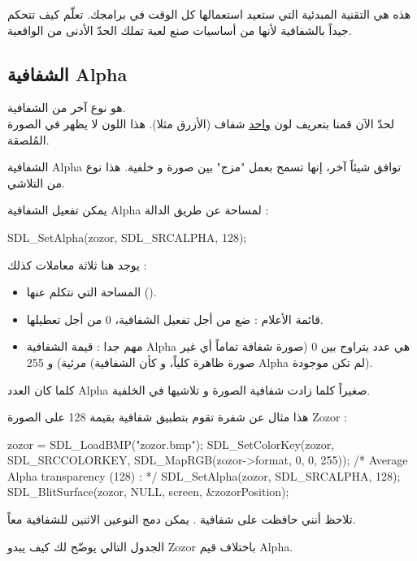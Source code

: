 هذه هي التقنية المبدئية التي ستعيد استعمالها كل الوقت في برامجك. تعلّم كيف تتحكم جيداً بالشفافية لأنها من أساسيات صنع لعبة تملك الحدّ الأدنى من الواقعية.

\subsection{الشفافية \textenglish{Alpha}}

هو نوع آخر من الشفافية.\\
لحدّ الآن قمنا بتعريف لون 
\underline{واحد}
شفاف (الأزرق مثلا). هذا اللون لا يظهر في الصورة المُلصقة. 

الشفافية 
\textenglish{Alpha}
توافق شيئاً آخر، إنها تسمح بعمل "مزج" بين صورة و خلفية. هذا نوع من التلاشي.

يمكن تفعيل الشفافية
\textenglish{Alpha}
لمساحة عن طريق الدالة
 :

\begin{Csource}
SDL_SetAlpha(zozor, SDL_SRCALPHA, 128);
\end{Csource}

يوجد هنا ثلاثة معاملات كذلك :

\begin{itemize}
	\item المساحة التي نتكلم عنها ().
	\item قائمة الأعلام : ضع
من أجل تفعيل الشفافية، 0 من أجل تعطيلها.
	\item مهم جدا : قيمة الشفافية 
\textenglish{Alpha}
هي عدد يتراوح بين 0 (صورة شفافة تماماً أي غير مرئية) و 255 (صورة ظاهرة كلياً، و كأن الشفافية
\textenglish{Alpha}
لم تكن موجودة).
\end{itemize}

كلما كان العدد
\textenglish{Alpha}
صغيراً كلما زادت شفافية الصورة و تلاشيها في الخلفية.

هذا مثال عن شفرة تقوم بتطبيق شفافية بقيمة 128 على الصورة
\textenglish{Zozor} :

\begin{Csource}
zozor = SDL_LoadBMP("zozor.bmp");
SDL_SetColorKey(zozor, SDL_SRCCOLORKEY, SDL_MapRGB(zozor->format, 0, 0, 255));
/* Average Alpha transparency (128) : */
SDL_SetAlpha(zozor, SDL_SRCALPHA, 128);
SDL_BlitSurface(zozor, NULL, screen, &zozorPosition);
\end{Csource}

تلاحظ أنني حافظت على شفافية 
.
يمكن دمج النوعين الاثنين للشفافية معاً.

الجدول التالي يوضّح لك كيف يبدو
\textenglish{Zozor}
باختلاف قيم
\textenglish{Alpha}.

